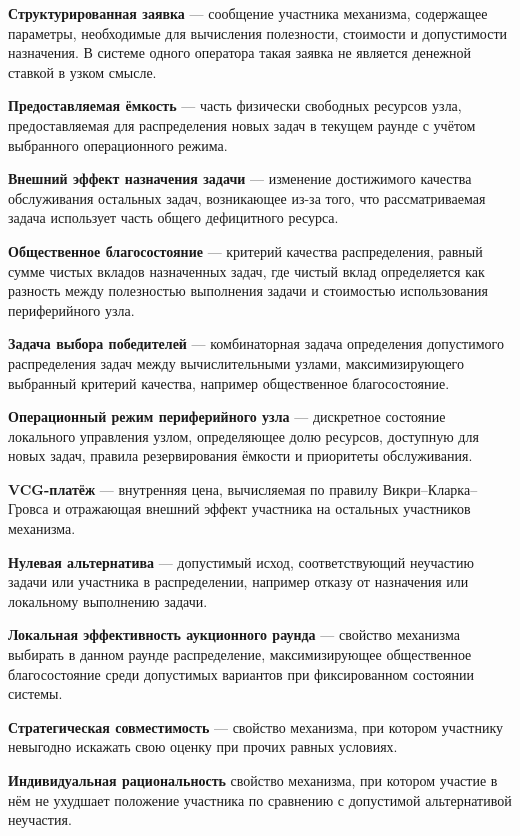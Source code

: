 \textbf{Структурированная заявка} --- сообщение участника механизма, содержащее параметры, необходимые для вычисления полезности, стоимости и допустимости назначения. В системе одного оператора такая заявка не является денежной ставкой в узком смысле.

\textbf{Предоставляемая ёмкость} --- часть физически свободных ресурсов узла, предоставляемая для распределения новых задач в текущем раунде с учётом выбранного операционного режима.

\textbf{Внешний эффект назначения задачи} --- изменение достижимого качества обслуживания остальных задач, возникающее из-за того, что рассматриваемая задача использует часть общего дефицитного ресурса.

\textbf{Общественное благосостояние} --- критерий качества распределения, равный сумме чистых вкладов назначенных задач, где чистый вклад определяется как разность между полезностью выполнения задачи и стоимостью использования периферийного узла.

\textbf{Задача выбора победителей} --- комбинаторная задача определения допустимого распределения задач между вычислительными узлами, максимизирующего выбранный критерий качества, например общественное благосостояние.

\textbf{Операционный режим периферийного узла} --- дискретное состояние локального управления узлом, определяющее долю ресурсов, доступную для новых задач, правила резервирования ёмкости и приоритеты обслуживания.

\textbf{VCG-платёж} --- внутренняя цена, вычисляемая по правилу Викри--Кларка--Гровса и отражающая внешний эффект участника на остальных участников механизма.

\textbf{Нулевая альтернатива} --- допустимый исход, соответствующий неучастию задачи или участника в распределении, например отказу от назначения или локальному выполнению задачи.

\textbf{Локальная эффективность аукционного раунда} --- свойство механизма выбирать в данном раунде распределение, максимизирующее общественное благосостояние среди допустимых вариантов при фиксированном состоянии системы.

\textbf{Стратегическая совместимость} --- свойство механизма, при котором участнику невыгодно искажать свою оценку при прочих равных условиях.

\textbf{Индивидуальная рациональность} свойство механизма, при котором участие в нём не ухудшает положение участника по сравнению с допустимой альтернативой неучастия.

